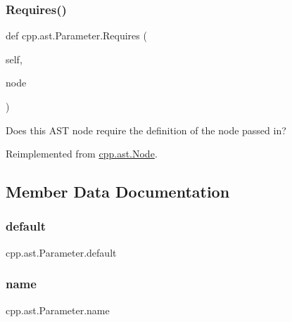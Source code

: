 \subsubsection{\texorpdfstring{Requires()}{Requires()}}
{\footnotesize\ttfamily def cpp.\+ast.\+Parameter.\+Requires (\begin{DoxyParamCaption}\item[{}]{self,  }\item[{}]{node }\end{DoxyParamCaption})}

\begin{DoxyVerb}Does this AST node require the definition of the node passed in?\end{DoxyVerb}
 

Reimplemented from \mbox{\hyperlink{classcpp_1_1ast_1_1_node_a31ae211f954a8c578ef16226df5ac8c8}{cpp.\+ast.\+Node}}.



\subsection{Member Data Documentation}
\mbox{\label{classcpp_1_1ast_1_1_parameter_a4ceae2ac87d82c5542c4e7385eb4c97e}} 
\subsubsection{\texorpdfstring{default}{default}}
{\footnotesize\ttfamily cpp.\+ast.\+Parameter.\+default}

\mbox{\label{classcpp_1_1ast_1_1_parameter_aae0375fb0ded8fa9090feea6bdff2784}} 
\subsubsection{\texorpdfstring{name}{name}}
{\footnotesize\ttfamily cpp.\+ast.\+Parameter.\+name}

\mbox{\label{classcpp_1_1ast_1_1_parameter_a5eed090000c41551a10c21f175ad33e3}} 
